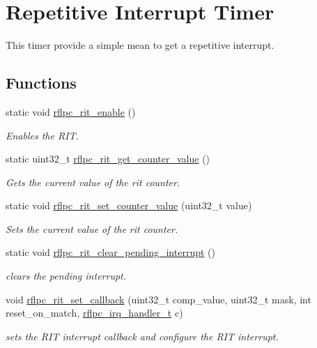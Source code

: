 \hypertarget{group__rit}{\section{Repetitive Interrupt Timer}
\label{group__rit}
}


This timer provide a simple mean to get a repetitive interrupt.  


\subsection*{Functions}
\begin{DoxyCompactItemize}
\item 
static void \hyperlink{group__rit_ga2860cda81e1e3fc5d4441f964c9b615d}{rflpc\-\_\-rit\-\_\-enable} ()
\begin{DoxyCompactList}\small\item\em Enables the R\-I\-T. \end{DoxyCompactList}\item 
\hypertarget{group__rit_ga9d790b6ec3e4052da2156e38fac01ede}{static uint32\-\_\-t \hyperlink{group__rit_ga9d790b6ec3e4052da2156e38fac01ede}{rflpc\-\_\-rit\-\_\-get\-\_\-counter\-\_\-value} ()}\label{group__rit_ga9d790b6ec3e4052da2156e38fac01ede}

\begin{DoxyCompactList}\small\item\em Gets the current value of the rit counter. \end{DoxyCompactList}\item 
\hypertarget{group__rit_ga36cabb41b0168d9aea9640644ed1ea23}{static void \hyperlink{group__rit_ga36cabb41b0168d9aea9640644ed1ea23}{rflpc\-\_\-rit\-\_\-set\-\_\-counter\-\_\-value} (uint32\-\_\-t value)}\label{group__rit_ga36cabb41b0168d9aea9640644ed1ea23}

\begin{DoxyCompactList}\small\item\em Sets the current value of the rit counter. \end{DoxyCompactList}\item 
static void \hyperlink{group__rit_ga2ef1d26b936739a2c96b5e9fc90339ae}{rflpc\-\_\-rit\-\_\-clear\-\_\-pending\-\_\-interrupt} ()
\begin{DoxyCompactList}\small\item\em clears the pending interrupt. \end{DoxyCompactList}\item 
void \hyperlink{group__rit_ga5e882b9898132d2281a1f012f7d2dd08}{rflpc\-\_\-rit\-\_\-set\-\_\-callback} (uint32\-\_\-t comp\-\_\-value, uint32\-\_\-t mask, int reset\-\_\-on\-\_\-match, \hyperlink{group__irq_ga4970a8a2cf9b63e4c261982504669a1f}{rflpc\-\_\-irq\-\_\-handler\-\_\-t} c)
\begin{DoxyCompactList}\small\item\em sets the R\-I\-T interrupt callback and configure the R\-I\-T interrupt. \end{DoxyCompactList}\end{DoxyCompactItemize}


